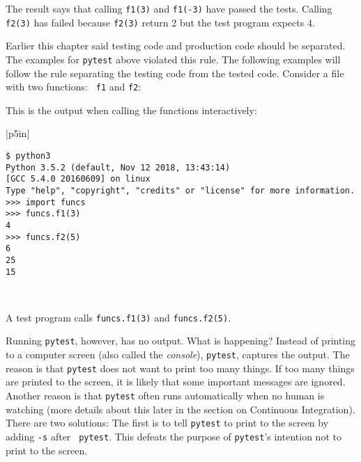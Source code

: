The result says that calling {\tt f1(3)} and {\tt f1(-3)} have passed
the tests. Calling {\tt f2(3)} has failed because {\tt f2(3)}
return 2 but the test program expects 4.

Earlier this chapter said testing code and production code should be
separated. The examples for {\tt pytest} above violated this rule.
The following examples will follow the rule separating the testing
code from the tested code. Consider a file with two functions: {\tt
  f1} and {\tt f2}:

\resetlinenumber[1]
\linenumbers
\begin{tt}
  
\end{tt}
\nolinenumbers

This is the output when calling the functions interactively:

\vspace{0.2in}

\noindent
\begin{tabular}{|p{5in}|}\hline
\begin{verbatim}
$ python3
Python 3.5.2 (default, Nov 12 2018, 13:43:14) 
[GCC 5.4.0 20160609] on linux
Type "help", "copyright", "credits" or "license" for more information.
>>> import funcs
>>> funcs.f1(3)
4
>>> funcs.f2(5)
6
25
15
\end{verbatim}
\\ \hline
\end{tabular}
\vspace{0.2in}

A test program calls {\tt funcs.f1(3)} and {\tt funcs.f2(5)}.

\resetlinenumber[1]
\linenumbers
\begin{tt}
  
\end{tt}
\nolinenumbers

Running {\tt pytest}, however, has no output. What is happening?
Instead of printing to a computer screen (also called the {\it
  console}), {\tt pytest}, captures the output.  The reason is that
{\tt pytest} does not want to print too many things.  If too many
things are printed to the screen, it is likely that some important
messages are ignored. Another reason is that {\tt pytest} often runs
automatically when no human is watching (more details about this
later in the section on Continuous Integration).
There are two solutions: The first is to tell
{\tt pytest} to print to the screen by adding {\tt -s} after {\tt
  pytest}.  This defeats the purpose of {\tt pytest}'s intention not
to print to the screen.

